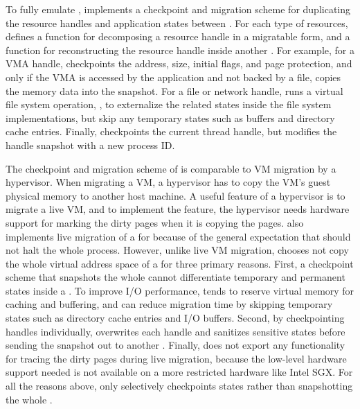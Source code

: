 To fully emulate , \thelibos{} implements
a checkpoint and migration scheme
for duplicating the resource handles and application states between \picoprocs{}.
For each type of resources, \thelibos{} defines a function for decomposing a resource handle in a migratable form,
and a function for reconstructing the resource handle inside another \picoproc{}.
For example,
for a VMA handle, \thelibos{} checkpoints the address, size, initial flags, and page protection,
and only if the VMA is accessed by the application and not backed by a file,
\thelibos{} copies the memory data into the snapshot.
For a file or network handle,
\thelibos{} runs a virtual file system operation,
,
to externalize the related states
inside the file system implementations,
but skip any temporary states such as buffers and directory cache entries.
Finally, \thelibos{} checkpoints the current thread handle, but modifies the handle snapshot with a new process ID.



The checkpoint and migration scheme of \thelibos{} is comparable to
VM migration by a hypervisor.
When migrating a VM, a hypervisor has to copy the VM's guest physical memory to another host machine.
A useful feature of a hypervisor is to migrate a live VM,
and to implement the feature, the hypervisor needs hardware support for marking the dirty pages when it is copying the pages.
\graphene{} also implements live migration of a \picoproc{} for 
because of the general expectation
that  should not halt the whole process.
However, unlike live VM migration, \graphene{} chooses not %
copy the whole virtual address space
of a \picoproc{}
for three primary reasons.
First, a checkpoint scheme that snapshots the whole \picoproc{}
cannot differentiate temporary and permanent states inside a \libos{}.
To improve I/O performance, \thelibos{} tends to reserve %
virtual memory for caching and buffering, and \thelibos{} can reduce migration time by skipping temporary states such as directory cache entries and I/O buffers.
Second, by checkpointing handles individually,
\thelibos{} overwrites each handle and sanitizes sensitive states before sending the snapshot out to another \picoproc{}.
Finally, \thehostabi{} does not export any functionality for tracing
the dirty pages during live migration,
because the low-level hardware support needed
is not available on a more restricted hardware like Intel SGX.
For all the reasons above,
\thelibos{} only selectively checkpoints \libos{} states rather than snapshotting the whole \picoproc{}.


